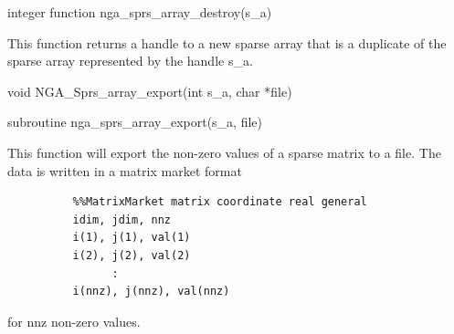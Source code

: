 \documentclass[12pt]{article}
\begin{document}
\begin{fapi}
\begin{fcode}
integer function nga_sprs_array_destroy(s_a)
\end{fcode}
\end{fapi}

\gcoll

\begin{desc}
This function returns a handle to a new sparse array that is a duplicate of the
sparse array represented by the handle s_a.
\end{desc}


\begin{capi}
\begin{ccode}
void NGA_Sprs_array_export(int s_a, char *file)
\end{ccode}
\begin{funcargs}
\end{funcargs}
\end{capi}

\begin{fapi}
\begin{fcode}
subroutine nga_sprs_array_export(s_a, file)
\end{fcode}
\end{fapi}

\gcoll

\begin{desc}
This function will export the non-zero values of a sparse matrix to a file. The
data is written in a matrix market format
\begin{verbatim}
          %%MatrixMarket matrix coordinate real general
          idim, jdim, nnz
          i(1), j(1), val(1)
          i(2), j(2), val(2)
                :
          i(nnz), j(nnz), val(nnz)
\end{verbatim}
for nnz non-zero values.
\end{desc}
\end{document}
